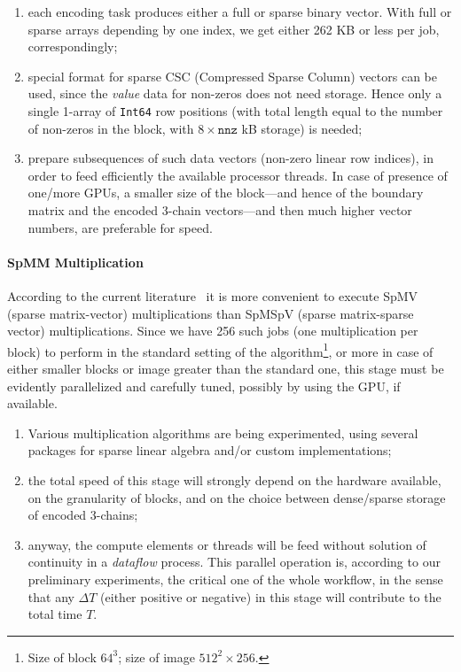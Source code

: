 \begin{enumerate}

\item each encoding task produces either a full or sparse binary vector. With full or sparse arrays depending by one index, we get either 262 KB or less per job, correspondingly;

\item special format for sparse CSC (Compressed Sparse Column) vectors can be used, since the \emph{value} data for non-zeros does not need storage. Hence only a single 1-array of \texttt{Int64} row positions (with total length equal to the number of non-zeros in the block, with $8\times\mathtt{nnz}$ kB storage) is needed;

\item prepare subsequences of such data vectors (non-zero linear row indices), in order to feed efficiently the available processor threads.
In case of presence of one/more GPUs, a smaller size of the block---and hence of the boundary matrix and the encoded 3-chain vectors---and then much higher vector numbers, are preferable for speed.

\end{enumerate}

\paragraph{SpMM Multiplication} 
According to the current literature~\cite{} it is more convenient to execute SpMV (sparse matrix-vector) multiplications than SpMSpV (sparse matrix-sparse vector) multiplications. Since we have 256 such jobs (one multiplication per block) to perform in the standard setting of the algorithm\footnote{
Size of block $64^3$; size of image $512^2\times 256$.
}, or more in case of either smaller blocks or image greater than the standard one, this stage must be evidently parallelized and carefully tuned, possibly by using the GPU, if available.
\begin{enumerate}

\item Various multiplication algorithms are being experimented, using several packages for sparse linear algebra and/or custom implementations;

\item the total speed of this stage will strongly depend on the hardware available, on the granularity of blocks, and on the choice between dense/sparse storage of encoded 3-chains;

\item anyway, the compute elements or threads will be feed without solution of continuity in a \emph{dataflow} process. This parallel operation is, according to our preliminary experiments, the critical one of the whole workflow, in the sense that any $\Delta T$ (either positive or negative) in this stage will contribute to the total time $T$.

\end{enumerate}

